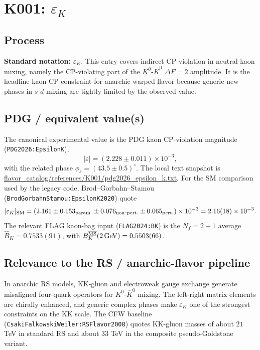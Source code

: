 
\section{\texorpdfstring{K001: \(\varepsilon_K\)}{K001: epsilon_K}}

\subsection*{Process}
\textbf{Standard notation:} \(\varepsilon_K\).  This entry covers indirect CP
violation in neutral-kaon mixing, namely the CP-violating part of the
\(K^0\)-\(\bar K^0\) \(\Delta F=2\) amplitude.  It is the headline kaon CP
constraint for anarchic warped flavor because generic new phases in
\(s\)-\(d\) mixing are tightly limited by the observed value.

\subsection*{PDG / equivalent value(s)}
The canonical experimental value is the PDG kaon CP-violation magnitude
(\texttt{PDG2026:EpsilonK}),
\[
  |\varepsilon| = (2.228 \pm 0.011)\times 10^{-3},
\]
with the related phase \(\phi_\varepsilon=(43.5\pm0.5)^\circ\).  The local text
snapshot is
\url{flavor_catalog/references/K001/pdg2026_epsilon_k.txt}.  For the SM
comparison used by the legacy code, Brod--Gorbahn--Stamou
(\texttt{BrodGorbahnStamou:EpsilonK2020}) quote
\[
  |\varepsilon_K|_{\rm SM}
  = (2.161 \pm 0.153_{\rm param.}\pm0.076_{\rm non\mbox{-}pert.}
     \pm0.065_{\rm pert.})\times10^{-3}
  = 2.16(18)\times10^{-3}.
\]
The relevant FLAG kaon-bag input (\texttt{FLAG2024:BK}) is the \(N_f=2+1\)
average \(\hat B_K=0.7533(91)\), with
\(B_K^{\overline{\rm MS}}(2\,{\rm GeV})=0.5503(66)\).

\subsection*{Relevance to the RS / anarchic-flavor pipeline}
In anarchic RS models, KK-gluon and electroweak gauge exchange generate
misaligned four-quark operators for \(K^0\)-\(\bar K^0\) mixing.  The
left-right matrix elements are chirally enhanced, and generic complex phases
make \(\varepsilon_K\) one of the strongest constraints on the KK scale.  The
CFW baseline (\texttt{CsakiFalkowskiWeiler:RSFlavor2008}) quotes KK-gluon
masses of about \(21\) TeV in standard RS and about \(33\) TeV in the composite
pseudo-Goldstone variant.

